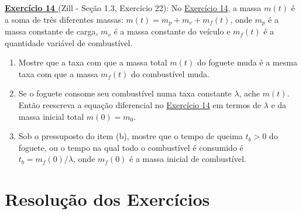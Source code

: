 \documentclass[oneside,12pt,a4paper]{report}
\begin{document}
    \noindent\textbf{\hyperlink{resp:ex14}{\hypertarget{quest:ex14}{Exercício 14 }}} (Zill - Seção 1.3, Exercício 22): No \hyperlink{quest:ex14}{Exercício 14}, a massa $m(t)$ é a soma de três diferentes massas: $m(t) = m_p + m_v + m_f(t)$, onde $m_p$ é a massa constante de carga, $m_v$ é a massa constante do veículo e $m_f(t)$ é a quantidade variável de combustível.
    \begin{enumerate}[label=\alph*)]
        \item Mostre que a taxa com que a massa total $m(t)$ do foguete muda é a mesma taxa com que a massa $m_f(t)$ do combustível muda.
        \item Se o foguete consome seu combustível numa taxa constante $\lambda$, ache $m(t)$. Então reescreva a equação diferencial no \hyperlink{quest:ex14}{Exercício 14} em termos de $\lambda$ e da massa inicial total $m(0) = m_0$.
        \item Sob o pressuposto do item (b), mostre que o tempo de queima $t_b > 0$ do foguete, ou o tempo na qual todo o combustível é consumido é $t_b = m_f(0)/\lambda$, onde $m_f(0)$ é a massa inicial de combustível.
    \end{enumerate}


    \chapter*{Resolução dos Exercícios}
\end{document}
